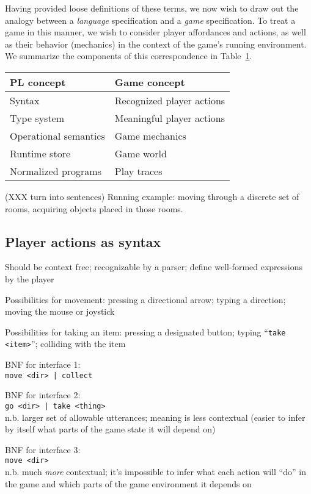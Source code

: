\documentclass[sigconf]{acmart}
\begin{document}
  Having provided loose definitions of these terms, we now wish to draw out
  the analogy between a {\em language} specification and a {\em game}
  specification. To treat a game in this manner, we wish to consider player
  affordances and actions, as well as their behavior (mechanics) in the
  context of the game's running environment. We summarize the components of
  this correspondence in Table~\ref{tab:correspondence}.

  \begin{table}
  \begin{tabular}{ll}
    PL concept & Game concept\\
    \hline
    Syntax & Recognized player actions \\
    Type system & Meaningful player actions \\
    Operational semantics & Game mechanics \\
    Runtime store & Game world \\
    Normalized programs & Play traces 
  \end{tabular}
  \label{tab:correspondence}
  \end{table}

  (XXX turn into sentences)
  Running example: moving through a discrete set of rooms,
  acquiring objects placed in those rooms.

  \subsection{Player actions as syntax}

  Should be context free; recognizable by a parser; define well-formed
  expressions by the player
  
  Possibilities for movement:
  pressing a directional arrow;
  typing a direction;
  moving the mouse or joystick

  Possibilities for taking an item:
  pressing a designated button;
  typing ``\verb/take <item>/'';
  colliding with the item

  BNF for interface 1:\\
  \verb/move <dir> | collect/

  BNF for interface 2:\\
  \verb/go <dir> | take <thing>/\\
  n.b. larger set of allowable utterances; meaning is less contextual
  (easier to infer by itself what parts of the game state it will depend
  on)

  BNF for interface 3:\\
  \verb/move <dir>/\\
  n.b. much {\em more} contextual; it's impossible to infer what each
  action will ``do'' in the game and which parts of the game environment it
  depends on
\end{document}
